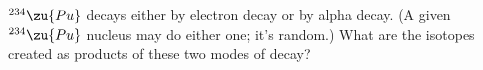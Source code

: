 $^{234}\zu{Pu}$ decays either by electron decay or by alpha
decay. (A given $^{234}\zu{Pu}$ nucleus may do either one; it's random.)
What are the isotopes created as products of these two modes
of decay?

